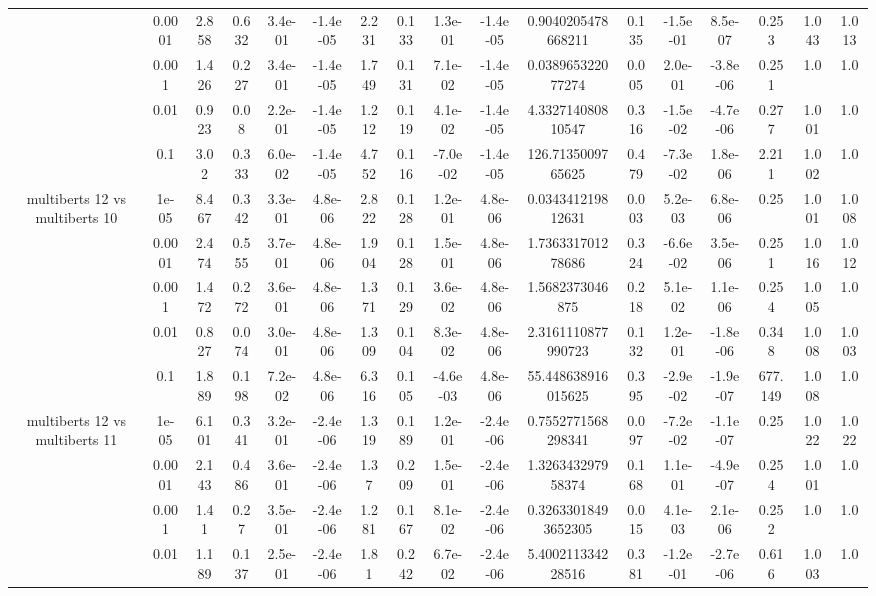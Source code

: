 \begin{tabular}{|c|c|c|c|c|c|c|c|c|c|c|c|c|c|c|c|c|}
 & 0.0001 & 2.858 & 0.632 & 3.4e-01 & -1.4e-05 & 2.231 & 0.133 & 1.3e-01 & -1.4e-05 & 0.9040205478668211 & 0.135 & -1.5e-01 & 8.5e-07 & 0.253 & 1.043 & 1.013 \\
 & 0.001 & 1.426 & 0.227 & 3.4e-01 & -1.4e-05 & 1.749 & 0.131 & 7.1e-02 & -1.4e-05 & 0.038965322077274 & 0.005 & 2.0e-01 & -3.8e-06 & 0.251 & 1.0 & 1.0 \\
 & 0.01 & 0.923 & 0.08 & 2.2e-01 & -1.4e-05 & 1.212 & 0.119 & 4.1e-02 & -1.4e-05 & 4.332714080810547 & 0.316 & -1.5e-02 & -4.7e-06 & 0.277 & 1.001 & 1.0 \\
 & 0.1 & 3.02 & 0.333 & 6.0e-02 & -1.4e-05 & 4.752 & 0.116 & -7.0e-02 & -1.4e-05 & 126.7135009765625 & 0.479 & -7.3e-02 & 1.8e-06 & 2.211 & 1.002 & 1.0 \\
\hline
\multirow{5}{*}{multiberts 12 vs multiberts 10} & 1e-05 & 8.467 & 0.342 & 3.3e-01 & 4.8e-06 & 2.822 & 0.128 & 1.2e-01 & 4.8e-06 & 0.034341219812631 & 0.003 & 5.2e-03 & 6.8e-06 & 0.25 & 1.001 & 1.008 \\
 & 0.0001 & 2.474 & 0.555 & 3.7e-01 & 4.8e-06 & 1.904 & 0.128 & 1.5e-01 & 4.8e-06 & 1.736331701278686 & 0.324 & -6.6e-02 & 3.5e-06 & 0.251 & 1.016 & 1.012 \\
 & 0.001 & 1.472 & 0.272 & 3.6e-01 & 4.8e-06 & 1.371 & 0.129 & 3.6e-02 & 4.8e-06 & 1.5682373046875 & 0.218 & 5.1e-02 & 1.1e-06 & 0.254 & 1.005 & 1.0 \\
 & 0.01 & 0.827 & 0.074 & 3.0e-01 & 4.8e-06 & 1.309 & 0.104 & 8.3e-02 & 4.8e-06 & 2.3161110877990723 & 0.132 & 1.2e-01 & -1.8e-06 & 0.348 & 1.008 & 1.003 \\
 & 0.1 & 1.889 & 0.198 & 7.2e-02 & 4.8e-06 & 6.316 & 0.105 & -4.6e-03 & 4.8e-06 & 55.448638916015625 & 0.395 & -2.9e-02 & -1.9e-07 & 677.149 & 1.008 & 1.0 \\
\hline
\multirow{5}{*}{multiberts 12 vs multiberts 11} & 1e-05 & 6.101 & 0.341 & 3.2e-01 & -2.4e-06 & 1.319 & 0.189 & 1.2e-01 & -2.4e-06 & 0.7552771568298341 & 0.097 & -7.2e-02 & -1.1e-07 & 0.25 & 1.022 & 1.022 \\
 & 0.0001 & 2.143 & 0.486 & 3.6e-01 & -2.4e-06 & 1.37 & 0.209 & 1.5e-01 & -2.4e-06 & 1.326343297958374 & 0.168 & 1.1e-01 & -4.9e-07 & 0.254 & 1.001 & 1.0 \\
 & 0.001 & 1.41 & 0.27 & 3.5e-01 & -2.4e-06 & 1.281 & 0.167 & 8.1e-02 & -2.4e-06 & 0.32633018493652305 & 0.015 & 4.1e-03 & 2.1e-06 & 0.252 & 1.0 & 1.0 \\
 & 0.01 & 1.189 & 0.137 & 2.5e-01 & -2.4e-06 & 1.81 & 0.242 & 6.7e-02 & -2.4e-06 & 5.400211334228516 & 0.381 & -1.2e-01 & -2.7e-06 & 0.616 & 1.003 & 1.0 \\

\end{tabular}
